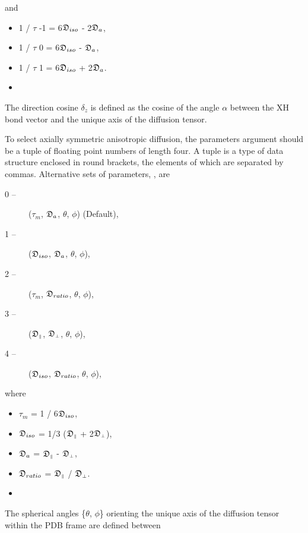  and 
  

 \begin{itemize} 
 \item[] 1 / $\tau$ -1 = 6$\mathfrak{D}_{iso}$ - 2$\mathfrak{D}_a$,  
 \item[] 1 / $\tau$ 0  = 6$\mathfrak{D}_{iso}$ - $\mathfrak{D}_a$,  
 \item[] 1 / $\tau$ 1  = 6$\mathfrak{D}_{iso}$ + 2$\mathfrak{D}_a$.  
 \item[]  
 \end{itemize} 
  

 The direction cosine $\delta_z$ is defined as the cosine of the angle $\alpha$ between the XH bond vector and the unique axis of the diffusion tensor. 
  

 To select axially symmetric anisotropic diffusion, the parameters argument should be a tuple of floating point numbers of length four.  A tuple is a type of data structure enclosed in round brackets, the elements of which are separated by commas.  Alternative sets of parameters, , are 
  

 \begin{description} 
 \item[0 --]  ($\tau_m$, $\mathfrak{D}_a$, $\theta$, $\phi$)   (Default),  
 \item[1 --]  ($\mathfrak{D}_{iso}$, $\mathfrak{D}_a$, $\theta$, $\phi$),  
 \item[2 --]  ($\tau_m$, $\mathfrak{D}_{ratio}$, $\theta$, $\phi$),  
 \item[3 --]  ($\mathfrak{D}_{\scriptscriptstyle \parallel}$, $\mathfrak{D}_{\scriptscriptstyle \perp}$, $\theta$, $\phi$),  
 \item[4 --]  ($\mathfrak{D}_{iso}$, $\mathfrak{D}_{ratio}$, $\theta$, $\phi$),  
 \end{description} 
  

 where 
  

 \begin{itemize} 
 \item[] $\tau_m$ = 1 / 6$\mathfrak{D}_{iso}$,  
 \item[] $\mathfrak{D}_{iso}$ = 1/3 ($\mathfrak{D}_{\scriptscriptstyle \parallel}$ + 2$\mathfrak{D}_{\scriptscriptstyle \perp}$),  
 \item[] $\mathfrak{D}_a$ = $\mathfrak{D}_{\scriptscriptstyle \parallel}$ - $\mathfrak{D}_{\scriptscriptstyle \perp}$,  
 \item[] $\mathfrak{D}_{ratio}$ = $\mathfrak{D}_{\scriptscriptstyle \parallel}$ / $\mathfrak{D}_{\scriptscriptstyle \perp}$.  
 \item[]  
 \end{itemize} 
  

 The spherical angles \{$\theta$, $\phi$\} orienting the unique axis of the diffusion tensor within the PDB frame are defined between 
  

